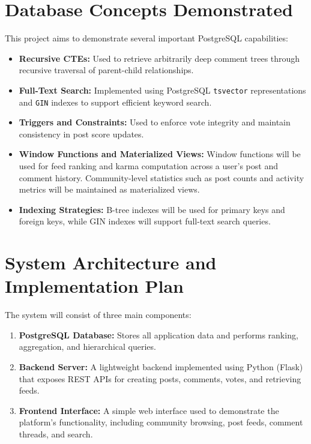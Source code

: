 \documentclass[11pt,a4paper]{article}
\begin{document}
\section*{Database Concepts Demonstrated}

This project aims to demonstrate several important PostgreSQL capabilities:

\begin{itemize}[noitemsep, topsep=4pt]
    \item \textbf{Recursive CTEs:} Used to retrieve arbitrarily deep comment trees through recursive traversal of parent-child relationships.

    \item \textbf{Full-Text Search:} Implemented using PostgreSQL \texttt{tsvector} representations and \texttt{GIN} indexes to support efficient keyword search.

    \item \textbf{Triggers and Constraints:} Used to enforce vote integrity and maintain consistency in post score updates.

    \item \textbf{Window Functions and Materialized Views:} Window functions will be used for feed ranking and karma computation across a user's post and comment history. Community-level statistics such as post counts and activity metrics will be maintained as materialized views.

    \item \textbf{Indexing Strategies:} B-tree indexes will be used for primary keys and foreign keys, while GIN indexes will support full-text search queries.
\end{itemize}

\section*{System Architecture and Implementation Plan}

The system will consist of three main components:

\begin{enumerate}[noitemsep, topsep=4pt]
    \item \textbf{PostgreSQL Database:} Stores all application data and performs ranking, aggregation, and hierarchical queries.

    \item \textbf{Backend Server:} A lightweight backend implemented using Python (Flask) that exposes REST APIs for creating posts, comments, votes, and retrieving feeds.

    \item \textbf{Frontend Interface:} A simple web interface used to demonstrate the platform's functionality, including community browsing, post feeds, comment threads, and search.
\end{enumerate}
\end{document}
